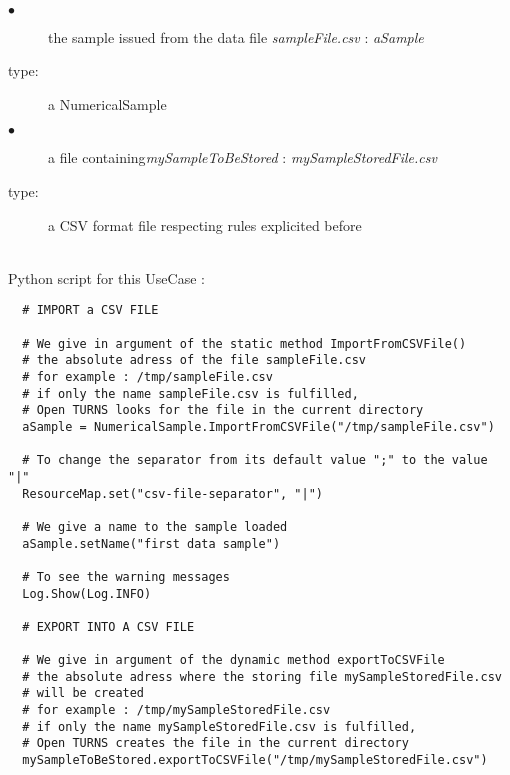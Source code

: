 \textspace\\
{
  \begin{description}
  \item[$\bullet$] the sample issued from the data file {\itshape sampleFile.csv} : {\itshape aSample}
  \item[type:]  a NumericalSample
  \item[$\bullet$]  a file containing{\itshape mySampleToBeStored} : {\itshape mySampleStoredFile.csv}
  \item[type:]  a CSV format file respecting rules explicited before
  \end{description}
}

\textspace\\
Python script for this UseCase :

\begin{lstlisting}
  # IMPORT a CSV FILE

  # We give in argument of the static method ImportFromCSVFile()
  # the absolute adress of the file sampleFile.csv
  # for example : /tmp/sampleFile.csv
  # if only the name sampleFile.csv is fulfilled,
  # Open TURNS looks for the file in the current directory
  aSample = NumericalSample.ImportFromCSVFile("/tmp/sampleFile.csv")

  # To change the separator from its default value ";" to the value "|"
  ResourceMap.set("csv-file-separator", "|")

  # We give a name to the sample loaded
  aSample.setName("first data sample")

  # To see the warning messages
  Log.Show(Log.INFO)

  # EXPORT INTO A CSV FILE

  # We give in argument of the dynamic method exportToCSVFile
  # the absolute adress where the storing file mySampleStoredFile.csv
  # will be created
  # for example : /tmp/mySampleStoredFile.csv
  # if only the name mySampleStoredFile.csv is fulfilled,
  # Open TURNS creates the file in the current directory
  mySampleToBeStored.exportToCSVFile("/tmp/mySampleStoredFile.csv")
\end{lstlisting}

